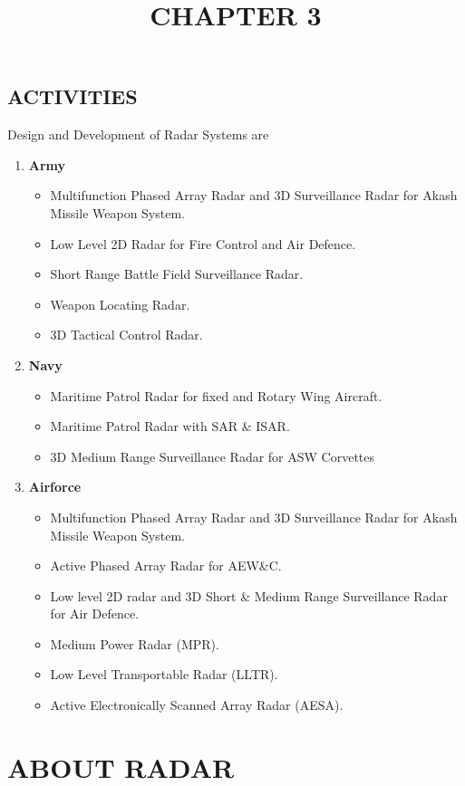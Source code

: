 \documentclass[14pt]{article} %
\begin{document}
\subsection{ACTIVITIES}
Design and Development of Radar Systems are
\begin{enumerate}
\item 
\textbf{Army}
\begin{itemize}
\item	Multifunction Phased Array Radar and 3D Surveillance Radar for Akash Missile Weapon System.
\item	 Low Level 2D Radar for Fire Control and Air Defence.
\item	 Short Range Battle Field Surveillance Radar.
\item	 Weapon Locating Radar.
\item	 3D Tactical Control Radar.
	 \end{itemize}
\item
\textbf{Navy}
\begin{itemize}
\item	Maritime Patrol Radar for fixed and Rotary Wing Aircraft.
\item	Maritime Patrol Radar with SAR \& ISAR.
\item	 3D Medium Range Surveillance Radar for ASW Corvettes
\end{itemize}
\item
\textbf{Airforce}
\begin{itemize}
\item	Multifunction Phased Array Radar and 3D Surveillance Radar for Akash Missile Weapon System.
\item	Active Phased Array Radar for AEW\&C.
\item	Low level 2D radar and 3D Short \& Medium Range Surveillance Radar for Air Defence.
\item	Medium Power Radar (MPR).
\item	 Low Level Transportable Radar (LLTR).
\item	Active Electronically Scanned Array Radar (AESA).
\end{itemize}

\end{enumerate}

\pagebreak

\title{CHAPTER 3}
\maketitle
\section{ABOUT RADAR}
\end{document}
